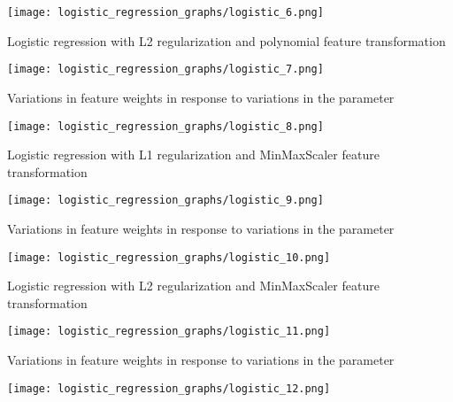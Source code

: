 \documentclass[12pt]{article}
\begin{document}
\begin{enumerate}
		\begin{center}
			\texttt{[image: logistic\_regression\_graphs/logistic\_6.png]}
		\end{center}
		
		Logistic regression with L2 regularization and polynomial feature transformation\\
		
		\begin{center}
			\texttt{[image: logistic\_regression\_graphs/logistic\_7.png]}
		\end{center}
		
		Variations in feature weights in response to variations in the parameter\\
		
		\begin{center}
			\texttt{[image: logistic\_regression\_graphs/logistic\_8.png]}
		\end{center}
		
		Logistic regression with L1 regularization and MinMaxScaler feature transformation\\
		
		\begin{center}
			\texttt{[image: logistic\_regression\_graphs/logistic\_9.png]}
		\end{center}
		
		Variations in feature weights in response to variations in the parameter\\
		
		\begin{center}
			\texttt{[image: logistic\_regression\_graphs/logistic\_10.png]}
		\end{center}
		
		Logistic regression with L2 regularization and MinMaxScaler feature transformation\\
		
		\begin{center}
			\texttt{[image: logistic\_regression\_graphs/logistic\_11.png]}
		\end{center}
		
		Variations in feature weights in response to variations in the parameter\\
		
		\begin{center}
			\texttt{[image: logistic\_regression\_graphs/logistic\_12.png]}
		\end{center}
		

\end{enumerate}
\end{document}
